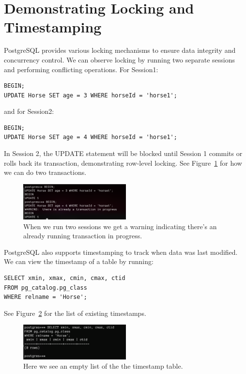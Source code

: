 \documentclass{article}
\begin{document}
\section{Demonstrating Locking and Timestamping} %
\label{sec:Demonstrating Locking and Timestamping}
PostgreSQL provides various locking mechanisms to ensure data integrity and concurrency control. We can observe locking by running two separate sessions and performing conflicting operations. For Session1:
\begin{lstlisting}
BEGIN;
UPDATE Horse SET age = 3 WHERE horseId = 'horse1';
\end{lstlisting}
and for Session2:
\begin{lstlisting}
BEGIN;
UPDATE Horse SET age = 4 WHERE horseId = 'horse1';
\end{lstlisting}
In Session 2, the UPDATE statement will be blocked until Session 1 commits or rolls back its transaction, demonstrating row-level locking. See Figure~\ref{fig:two sessions} for how we can do two transactions.
\begin{figure}
	\begin{center}
		\includegraphics[width=0.5\textwidth]{figures/two_sessions.png}
	\end{center}
	\caption{When we run two sessions we get a warning indicating there's an already running transaction in progress. }\label{fig:two sessions}
\end{figure}


PostgreSQL also supports timestamping to track when data was last modified. We can view the timestamp of a table by running:
\begin{lstlisting}
SELECT xmin, xmax, cmin, cmax, ctid
FROM pg_catalog.pg_class
WHERE relname = 'Horse';
\end{lstlisting}
See Figure~\ref{fig:timestamp table} for the list of existing timestamps.
\begin{figure}
	\begin{center}
		\includegraphics[width=0.5\textwidth]{figures/timestamp_table.png}
	\end{center}
	\caption{Here we see an empty list of the the timestamp table. }\label{fig:timestamp table}
\end{figure}
\end{document}
